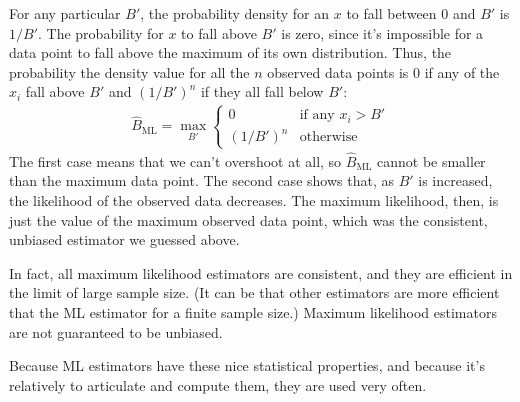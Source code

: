 For any particular $B'$, the probability density for an $x$ to fall between 0
and $B'$ is $1/B'$. The probability for $x$ to fall above $B'$ is zero, since
it's impossible for a data point to fall above the maximum of its own
distribution. Thus, the probability the density value for all the $n$ observed
data points is 0 if any of the $x_i$ fall above $B'$ and $(1/B')^n$ if they all
fall below $B'$:
\begin{align*}
\hat{B}_\text{ML} = \max_{B'} \begin{cases}
0 &\text{if any $x_i > B'$} \\
(1 / B')^n &\text{otherwise}
\end{cases}
\end{align*}
The first case means that we can't overshoot at all, so $\hat{B}_\text{ML}$
cannot be smaller than the maximum data point. The second case shows that,
as $B'$ is increased, the likelihood of the observed data decreases. The maximum
likelihood, then, is just the value of the maximum observed data point, which
was the consistent, unbiased estimator we guessed above.

In fact, all maximum likelihood estimators are consistent, and they are
efficient in the limit of large sample size. (It can be that other estimators
are more efficient that the ML estimator for a finite sample size.) Maximum
likelihood estimators are not guaranteed to be unbiased.

Because ML estimators have these nice statistical properties, and because it's
relatively to articulate and compute them, they are used very often.

